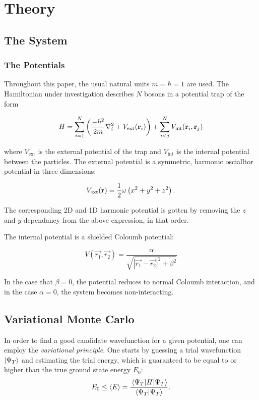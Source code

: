 \section{Theory}\label{sec:Theory}

\subsection{The System}
\subsubsection{The Potentials}
Throughout this paper, the usual natural units $m=\hbar = 1$ are used. 
The Hamiltonian under investigation describes \(N\) bosons in a potential trap
of the form

\begin{equation*}
H = \sum_{i=1}^{N}\left( \frac{-\hbar^{2}}{2m}\nabla^{2}_{i} + V_{\text{ext}}(\vb{r}_{i})\right) + \sum_{i<j}^{N}V_{\text{int}}(\vb{r}_{i}, \vb{r}_{j})
\end{equation*}

where \(V_{\text{ext}}\) is the external potential of the trap and 
\(V_{\text{int}}\) is the internal potential between the particles. 
The external potential is a symmetric, harmonic oscialltor potential in three dimensions:

\begin{equation}
\label{eq:2}
V_{\text{ext}}(\vb{r}) = \frac{1}{2}\omega\left( x^{2} + y^{2} + z^{2}  \right).
\end{equation}

The corresponding 2D and 1D harmonic potential is gotten by removing the $z$ and $y$ dependancy from the above expression, in that order.

The internal potential is a shielded Coloumb potential:

\begin{equation}
	V(\vec{r_1}, \vec{r_2}) = \frac{\alpha}{\sqrt{|\vec{r_1} - \vec{r_2}|^2 + \beta^2}}
\end{equation}

In the case that $\beta = 0$, the potential reduces to normal Coloumb interaction, and in the case $\alpha = 0$, the system becomes non-interacting. 

\newcommand{\psit}{\Psi_T(\vb{r})}
\newcommand{\onebody}{\prod_{i}^{N}\exp{-\alpha\left[\left( x_i^2 + y_i^2 + \beta
		z_i^2\right)\right]}}



\subsection{Variational Monte Carlo}
In order to find a good candidate wavefunction for a given potential, one can
employ the \textit{variational principle}. One starts by guessing a trial
wavefunction \(\ket{\Psi_{T}}\) and estimating the trial energy, which is
guaranteed to be equal to or higher than the true ground state energy \(E_{0}\):
\begin{equation}
  \label{eq:1}
  E_{0} \le \langle E \rangle = \frac{\ev{H}{\Psi_{T}}}{\ip{\Psi_{T}}}.
\end{equation}

